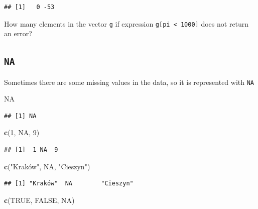 \documentclass[
]{book}
\makeatletter
\newenvironment{Shaded}{\begin{snugshade}}{\end{snugshade}}
\newcommand{\DecValTok}[1]{\textcolor[rgb]{0.00,0.00,0.81}{#1}}
\newcommand{\KeywordTok}[1]{\textcolor[rgb]{0.13,0.29,0.53}{\textbf{#1}}}
\newcommand{\NormalTok}[1]{#1}
\newcommand{\OtherTok}[1]{\textcolor[rgb]{0.56,0.35,0.01}{#1}}
\newcommand{\StringTok}[1]{\textcolor[rgb]{0.31,0.60,0.02}{#1}}
\newenvironment{kframe}{%
\medskip{}
\setlength{\fboxsep}{.8em}
 \def\at@end@of@kframe{}%
 \ifinner\ifhmode%
  \def\at@end@of@kframe{\end{minipage}}%
  \begin{minipage}{\columnwidth}%
 \fi\fi%
 \def\FrameCommand##1{\hskip\@totalleftmargin \hskip-\fboxsep
 \colorbox{shadecolor}{##1}\hskip-\fboxsep
     \hskip-\linewidth \hskip-\@totalleftmargin \hskip\columnwidth}%
 \MakeFramed {\advance\hsize-\width
   \@totalleftmargin\z@ \linewidth\hsize
   \@setminipage}}%
 {\par\unskip\endMakeFramed%
 \at@end@of@kframe}
\newenvironment{rmdblock}[1]
  {
  \begin{itemize}
  \renewcommand{\labelitemi}{
    \raisebox{-.7\height}[0pt][0pt]{
      {\setkeys{Gin}{width=3em,keepaspectratio}\texttt{[image: images/\#1]}}
    }
  }
  \setlength{\fboxsep}{1em}
  \begin{kframe}
  \item
  }
  {
  \end{kframe}
  \end{itemize}
  }
\newenvironment{rmdtask}
  {\begin{rmdblock}{task}}
  {\end{rmdblock}}
\makeatother
\begin{document}
\begin{verbatim}
## [1]   0 -53
\end{verbatim}

\begin{rmdtask}
How many elements in the vector \texttt{g} if expression
\texttt{g{[}pi\ \textless{}\ 1000{]}} does not return an error?
\end{rmdtask}

\hypertarget{na}{%
\subsection{\texorpdfstring{\texttt{NA}}{NA}}\label{na}}

Sometimes there are some missing values in the data, so it is represented with \texttt{NA}

\begin{Shaded}
\begin{Highlighting}[]
\OtherTok{NA}
\end{Highlighting}
\end{Shaded}

\begin{verbatim}
## [1] NA
\end{verbatim}

\begin{Shaded}
\begin{Highlighting}[]
\KeywordTok{c}\NormalTok{(}\DecValTok{1}\NormalTok{, }\OtherTok{NA}\NormalTok{, }\DecValTok{9}\NormalTok{)}
\end{Highlighting}
\end{Shaded}

\begin{verbatim}
## [1]  1 NA  9
\end{verbatim}

\begin{Shaded}
\begin{Highlighting}[]
\KeywordTok{c}\NormalTok{(}\StringTok{"Kraków", NA, "}\NormalTok{Cieszyn}\StringTok{")}
\end{Highlighting}
\end{Shaded}

\begin{verbatim}
## [1] "Kraków"  NA        "Cieszyn"
\end{verbatim}

\begin{Shaded}
\begin{Highlighting}[]
\KeywordTok{c}\NormalTok{(}\OtherTok{TRUE}\NormalTok{, }\OtherTok{FALSE}\NormalTok{, }\OtherTok{NA}\NormalTok{)}
\end{Highlighting}
\end{Shaded}
\end{document}
